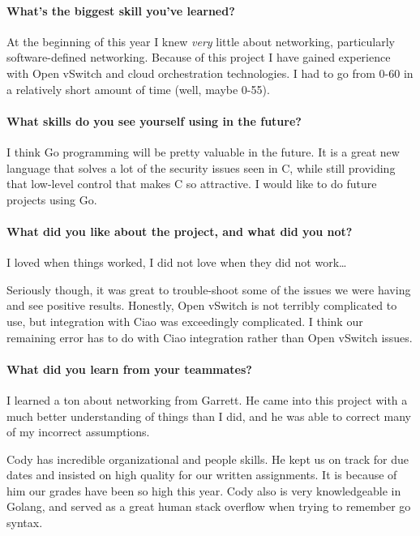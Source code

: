 \documentclass[10pt,onecolumn,journal,draftclsnofoot]{IEEEtran}
\begin{document}
\paragraph{What's the biggest skill you've
learned?} 

At the beginning of this year I knew \emph{very} little about
networking, particularly software-defined networking. Because of this
project I have gained experience with Open vSwitch and cloud
orchestration technologies. I had to go from 0-60 in a relatively short
amount of time (well, maybe 0-55).

\paragraph{What skills do you see yourself using in the
future?} 

I think Go programming will be pretty valuable in the future. It is a
great new language that solves a lot of the security issues seen in C,
while still providing that low-level control that makes C so attractive.
I would like to do future projects using Go.

\paragraph{What did you like about the project, and what did you
not?} 

I loved when things worked, I did not love when they did not
work\ldots{}

Seriously though, it was great to trouble-shoot some of the issues we
were having and see positive results. Honestly, Open vSwitch is not
terribly complicated to use, but integration with Ciao was exceedingly
complicated. I think our remaining error has to do with Ciao integration
rather than Open vSwitch issues.

\paragraph{What did you learn from your
teammates?} 

I learned a ton about networking from Garrett. He came into this project
with a much better understanding of things than I did, and he was able
to correct many of my incorrect assumptions.

Cody has incredible organizational and people skills. He kept us on
track for due dates and insisted on high quality for our written
assignments. It is because of him our grades have been so high this
year. Cody also is very knowledgeable in Golang, and served as a great
human stack overflow when trying to remember go syntax.
\end{document}
